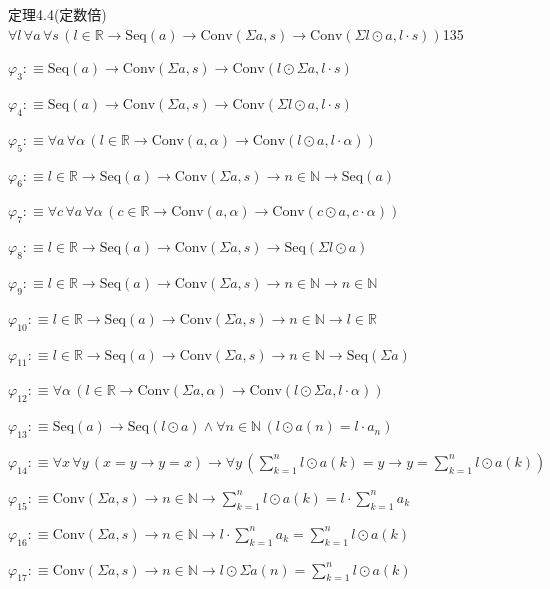 \begin{fullproof}{定理4.4(定数倍)}{$\forall l\,\forall a\,\forall s\,(l \in \mathbb{R} \to \mathrm{Seq}(a) \to \mathrm{Conv}(\Sigma a,s) \to \mathrm{Conv}(\Sigma l \odot a,l \cdot s))$}{135}
\begin{abbrevlist}
\item $\varphi_{3} :\equiv \mathrm{Seq}(a) \to \mathrm{Conv}(\Sigma a,s) \to \mathrm{Conv}(l \odot \Sigma a,l \cdot s)$
\item $\varphi_{4} :\equiv \mathrm{Seq}(a) \to \mathrm{Conv}(\Sigma a,s) \to \mathrm{Conv}(\Sigma l \odot a,l \cdot s)$
\item $\varphi_{5} :\equiv \forall a\,\forall \alpha\,(l \in \mathbb{R} \to \mathrm{Conv}(a,\alpha) \to \mathrm{Conv}(l \odot a,l \cdot \alpha))$
\item $\varphi_{6} :\equiv l \in \mathbb{R} \to \mathrm{Seq}(a) \to \mathrm{Conv}(\Sigma a,s) \to n \in \mathbb{N} \to \mathrm{Seq}(a)$
\item $\varphi_{7} :\equiv \forall c\,\forall a\,\forall \alpha\,(c \in \mathbb{R} \to \mathrm{Conv}(a,\alpha) \to \mathrm{Conv}(c \odot a,c \cdot \alpha))$
\item $\varphi_{8} :\equiv l \in \mathbb{R} \to \mathrm{Seq}(a) \to \mathrm{Conv}(\Sigma a,s) \to \mathrm{Seq}(\Sigma l \odot a)$
\item $\varphi_{9} :\equiv l \in \mathbb{R} \to \mathrm{Seq}(a) \to \mathrm{Conv}(\Sigma a,s) \to n \in \mathbb{N} \to n \in \mathbb{N}$
\item $\varphi_{10} :\equiv l \in \mathbb{R} \to \mathrm{Seq}(a) \to \mathrm{Conv}(\Sigma a,s) \to n \in \mathbb{N} \to l \in \mathbb{R}$
\item $\varphi_{11} :\equiv l \in \mathbb{R} \to \mathrm{Seq}(a) \to \mathrm{Conv}(\Sigma a,s) \to n \in \mathbb{N} \to \mathrm{Seq}(\Sigma a)$
\item $\varphi_{12} :\equiv \forall \alpha\,(l \in \mathbb{R} \to \mathrm{Conv}(\Sigma a,\alpha) \to \mathrm{Conv}(l \odot \Sigma a,l \cdot \alpha))$
\item $\varphi_{13} :\equiv \mathrm{Seq}(a) \to \mathrm{Seq}(l \odot a) \land \forall n \in \mathbb{N}\,(l \odot a(n) = l \cdot a_{n})$
\item $\varphi_{14} :\equiv \forall x\,\forall y\,(x = y \to y = x) \to \forall y\,({\textstyle\sum_{k=1}^{n} l \odot a(k)} = y \to y = {\textstyle\sum_{k=1}^{n} l \odot a(k)})$
\item $\varphi_{15} :\equiv \mathrm{Conv}(\Sigma a,s) \to n \in \mathbb{N} \to {\textstyle\sum_{k=1}^{n} l \odot a(k)} = l \cdot {\textstyle\sum_{k=1}^{n} a_{k}}$
\item $\varphi_{16} :\equiv \mathrm{Conv}(\Sigma a,s) \to n \in \mathbb{N} \to l \cdot {\textstyle\sum_{k=1}^{n} a_{k}} = {\textstyle\sum_{k=1}^{n} l \odot a(k)}$
\item $\varphi_{17} :\equiv \mathrm{Conv}(\Sigma a,s) \to n \in \mathbb{N} \to l \odot \Sigma a(n) = {\textstyle\sum_{k=1}^{n} l \odot a(k)}$

\end{abbrevlist}
\end{fullproof}
